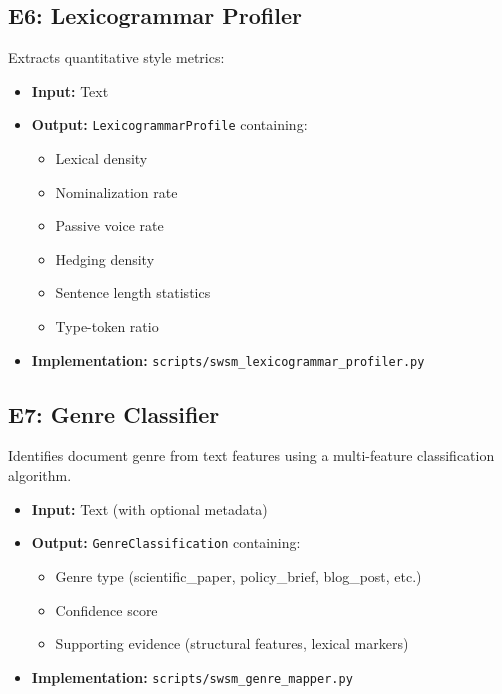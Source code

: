 \subsection{E6: Lexicogrammar Profiler}
\label{sec:sw-e6}

Extracts quantitative style metrics:

\begin{itemize}
    \item \textbf{Input:} Text
    \item \textbf{Output:} \texttt{LexicogrammarProfile} containing:
    \begin{itemize}
        \item Lexical density
        \item Nominalization rate
        \item Passive voice rate
        \item Hedging density
        \item Sentence length statistics
        \item Type-token ratio
    \end{itemize}
    \item \textbf{Implementation:} \texttt{scripts/swsm\_lexicogrammar\_profiler.py}
\end{itemize}

\subsection{E7: Genre Classifier}
\label{sec:sw-e7}

Identifies document genre from text features using a multi-feature classification algorithm.

\begin{itemize}
    \item \textbf{Input:} Text (with optional metadata)
    \item \textbf{Output:} \texttt{GenreClassification} containing:
    \begin{itemize}
        \item Genre type (scientific\_paper, policy\_brief, blog\_post, etc.)
        \item Confidence score
        \item Supporting evidence (structural features, lexical markers)
    \end{itemize}
    \item \textbf{Implementation:} \texttt{scripts/swsm\_genre\_mapper.py}
\end{itemize}

